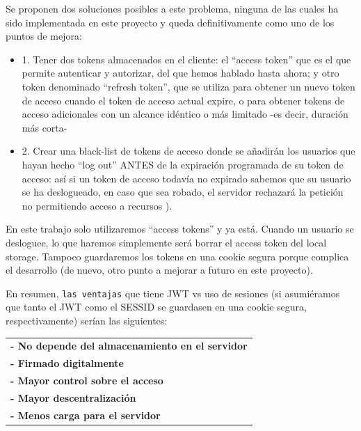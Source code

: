 \documentclass[a4paper,12pt]{report}
\begin{document}
				Se proponen dos soluciones posibles a este problema, ninguna de las cuales ha sido implementada en este proyecto y queda definitivamente como uno de los puntos de mejora:
				
				\begin{itemize}
					\setlength{\itemsep}{.0em}
				
					\item 1. Tener dos tokens almacenados en el cliente: el ``access token'' que es el que permite autenticar y autorizar, del que hemos hablado hasta ahora; y otro token denominado ``refresh token'', que se utiliza
					para obtener un nuevo token de acceso cuando el token de acceso actual expire, o para obtener tokens de acceso adicionales con un alcance idéntico o más limitado -es decir, duración más corta- \cite{stackoverflow_refreshTokenAvantatjaSeguretat}
					
					\item 2. Crear una black-list de tokens de acceso donde se añadirán los usuarios que hayan hecho ``log out'' ANTES de la expiración programada de su token de acceso: así si un token de acceso todavía no expirado sabemos que su usuario se ha deslogueado, en caso que sea robado, el servidor rechazará la petición no permitiendo acceso a recursos \cite{stackOverflow_blackList}).
 
					
				\end{itemize}

				
				
				En este trabajo solo utilizaremos ``access tokens'' y ya está. Cuando un usuario se desloguee, lo que haremos simplemente será borrar el access token del local storage. Tampoco guardaremos los tokens en una cookie segura porque complica el desarrollo (de nuevo, otro punto a mejorar a futuro en este proyecto).
			
				 
				 \noindent En resumen, \texttt{las ventajas} que tiene JWT vs uso de sesiones (si asumiéramos que tanto el JWT como el SESSID se guardasen en una cookie segura, respectivamente) serían las siguientes:
				 
					\begin{tabular}{l}
						\textbf{- No depende del almacenamiento en el servidor} \\
						\textbf{- Firmado digitalmente} \\
						\textbf{- Mayor control sobre el acceso} \\
						\textbf{- Mayor descentralización} \\
						\textbf{- Menos carga para el servidor}
					\end{tabular}
									 
\end{document}

